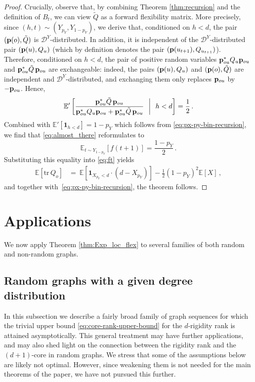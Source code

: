 \documentclass[reqno,english]{amsart}
\numberwithin{equation}{section}
\theoremstyle{definition}{
\newtheorem{example}[theorem]{Example}
\newtheorem{definition}[theorem]{Definition}
\newtheorem*{definition*}{Definition}
\newtheorem{problem}[theorem]{Problem}
\newtheorem{question}[theorem]{Question}
}
\newcommand{\E}{\mathbb E}
\newcommand{\cD}{\mathcal D}
\newcommand{\p}{{\bf p}}
\newcommand{\tr}{{\mathrm {tr}}}
\begin{document}
\begin{proof}
Crucially, observe that, by combining Theorem \ref{thm:recursion} and the definition of $B_t$, we can view $\tilde Q$ as a forward flexibility matrix. More precisely, since $(h,t)\sim (Y_{p_Y},Y_{1-p_Y})$, we derive that, conditioned on $h<d$, the pair $(\p(o),\tilde Q)$ is $\cD^Y$-distributed.
In addition, it is independent of the $\cD^Y$-distributed pair $(\p(u),Q_u)$ (which by definition denotes the pair $(\p(u_{t+1}),Q_{u_{t+1}})$).
Therefore, conditioned on $h<d$, the pair of positive random variables
$\p_{ou}^*Q_{u}\p_{ou}$ and 
$\p_{ou}^*\tilde Q\,\p_{ou}$
are exchangeable: indeed, the pairs \((\p(u),Q_u)\) and \((\p(o),\tilde Q)\) are independent and $\cD^Y$-distributed, and exchanging them only replaces \(\p_{ou}\) by \(-\p_{ou}\). Hence,
\[
\E'\left[ \frac{\p_{ou}^*\tilde Q\,\p_{ou}}{\p_{ou}^*Q_{u}\p_{ou}+\p_{ou}^*\tilde Q\,\p_{ou}} ~~\middle |~~ h<d \right]=\frac{1}{2}\,.
\]
Combined with $\E'[\mathbf 1_{h<d}]=1-p_Y$ which follows from \eqref{eq:px-py-bin-recursion}, we find that \eqref{eq:almost_there} reformulates to
\[
\E_{t\sim Y_{1-p_Y}}[f(t+1)]=\frac{1-p_Y}{2}\,.
\]
Substituting this equality into \eqref{eq:ft} yields
\begin{align*}
    \E[\tr\,Q_o]
    &=~
\E[\mathbf 1_{X_{p_Y}<d}\cdot(d-X_{p_Y})] - \frac12(1-p_Y)^2\E[X]\,,
\end{align*}
and together with~\eqref{eq:px-py-bin-recursion}, the theorem follows.

\end{proof}

\section{Applications}\label{sec:applications}
We now apply Theorem \ref{thm:Exp_loc_flex} to several families of both random and non-random graphs. 
\subsection{Random graphs with a given degree distribution}\label{sec:X}
In this subsection we describe a fairly broad family of graph sequences for which the trivial upper bound \eqref{eq:core-rank-upper-bound} for the \(d\)-rigidity rank is attained asymptotically. 
This general treatment may have further applications, and may also shed light on the connection between the rigidity rank and the \((d+1)\)-core in random graphs. We stress that some of the assumptions below are likely not optimal. However, since weakening them is not needed for the main theorems of the paper, we have not pursued this further.
\end{document}
